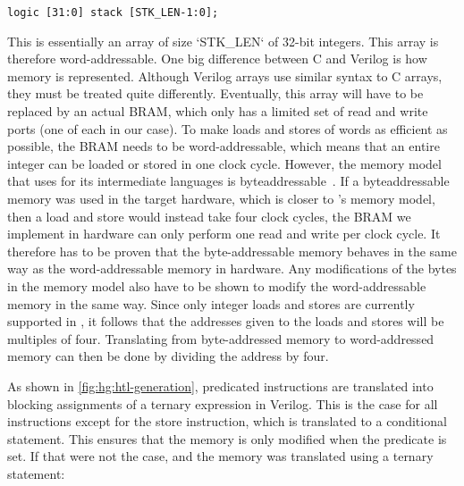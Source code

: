 \begin{verbatim}
logic [31:0] stack [STK_LEN-1:0];
\end{verbatim}

This is essentially an array of size \veriloginline`STK_LEN` of 32-bit integers.
This array is therefore word-addressable.  One big difference between C and
Verilog is how memory is represented.  Although Verilog arrays use similar
syntax to C arrays, they must be treated quite differently.  Eventually, this
array will have to be replaced by an actual \gls{BRAM}, which only has a limited set of
read and write ports (one of each in our case).  To make loads and stores of
words as efficient as possible, the \gls{BRAM} needs to be word-addressable, which
means that an entire integer can be loaded or stored in one clock cycle.
However, the memory model that \compcert{} uses for its intermediate languages
is byte\?addressable~\cite{blazy05_formal_verif_memor_model_c}.  If a
byte\?addressable memory was used in the target hardware, which is closer to
\compcert{}'s memory model, then a load and store would instead take four clock
cycles, the \gls{BRAM} we implement in hardware can only perform one read and write per
clock cycle.  It therefore has to be proven that the byte-addressable memory
behaves in the same way as the word-addressable memory in hardware.  Any
modifications of the bytes in the \compcert{} memory model also have to be shown
to modify the word-addressable memory in the same way.  Since only integer loads
and stores are currently supported in \vericert{}, it follows that the addresses
given to the loads and stores will be multiples of four.  Translating from
byte-addressed memory to word-addressed memory can then be done by dividing the
address by four.

As shown in \cref{fig:hg:htl-generation}, predicated instructions are translated
into blocking assignments of a ternary expression in Verilog.  This is the case
for all instructions except for the store instruction, which is translated to a
conditional statement.  This ensures that the memory is only modified when the
predicate is set.  If that were not the case, and the memory was translated
using a ternary statement:

\begin{center}
\end{center}


